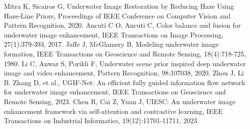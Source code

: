 \documentclass{apmcmthesis}                                             %
\begin{document}















































\newpage

\begin{thebibliography}{9}%

 Mitra K, Sicairos G, Underwater Image Restoration by Reducing Haze Using Haze-Line Priors, Proceedings of IEEE Conference on Computer Vision and Pattern Recognition, 2020.
 Ancuti C O, Ancuti C, Color balance and fusion for underwater image enhancement, IEEE Transactions on Image Processing, 27(1):379-393, 2017.
 Jaffe J, McGlamery B, Modeling underwater image formation, IEEE Transactions on Geoscience and Remote Sensing, 18(4):718-725, 1980.
 Li C, Anwar S, Porikli F, Underwater scene prior inspired deep underwater image and video enhancement, Pattern Recognition, 98:107038, 2020.
 Zhou J, Li B, Zhang D, et al., UGIF-Net: An efficient fully guided information flow network for underwater image enhancement, IEEE Transactions on Geoscience and Remote Sensing, 2023.
 Chen R, Cai Z, Yuan J, UIESC: An underwater image enhancement framework via self-attention and contrastive learning, IEEE Transactions on Industrial Informatics, 19(12):11701-11711, 2023.

\end{thebibliography}
\end{document}

